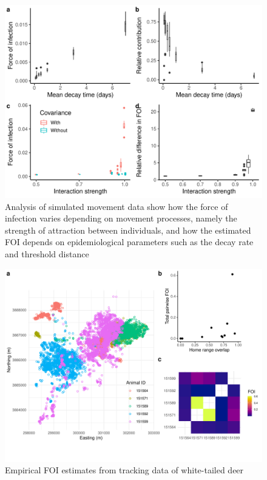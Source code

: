 \documentclass[letterpaper]{article}
\begin{document}
\begin{figure}
    \includegraphics[width=\textwidth]{figures/sim_results.pdf}
    \caption{Analysis of simulated movement data show how the force of infection varies depending on movement processes, namely the strength of attraction between individuals, and how the estimated FOI depends on epidemiological parameters such as the decay rate and threshold distance}
	\label{fig:simresults}
\end{figure}


\begin{figure}
     \includegraphics[width=\textwidth]{figures/deer_results.pdf}
    \caption{Empirical FOI estimates from tracking data of white-tailed deer}
	\label{fig:empiricalres}
\end{figure}
\end{document}
